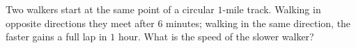 Two walkers start at the same point of a circular $1$-mile track. Walking in opposite directions they meet after $6$ minutes; walking in the same direction, the faster gains a full lap in $1$ hour. What is the speed of the slower walker?
